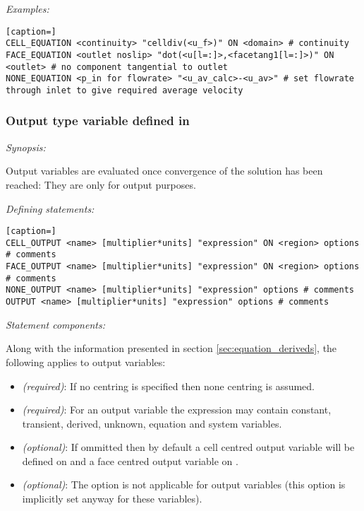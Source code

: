 \emph{Examples:}

\begin{lstlisting}[caption=]
CELL_EQUATION <continuity> "celldiv(<u_f>)" ON <domain> # continuity
FACE_EQUATION <outlet noslip> "dot(<u[l=:]>,<facetang1[l=:]>)" ON <outlet> # no component tangential to outlet
NONE_EQUATION <p_in for flowrate> "<u_av_calc>-<u_av>" # set flowrate through inlet to give required average velocity
\end{lstlisting}

\subsubsection{Output type variable defined in }

\emph{Synopsis:}

Output variables are evaluated once convergence of the solution has been reached:  They are only for output purposes.

\emph{Defining statements:}

\begin{lstlisting}[caption=]
CELL_OUTPUT <name> [multiplier*units] "expression" ON <region> options # comments
FACE_OUTPUT <name> [multiplier*units] "expression" ON <region> options # comments
NONE_OUTPUT <name> [multiplier*units] "expression" options # comments
OUTPUT <name> [multiplier*units] "expression" options # comments
\end{lstlisting}

\emph{Statement components:}

Along with the information presented in section \ref{sec:equation_deriveds}, the following applies to output variables:

\begin{itemize}
\item {} \emph{(required)}:  If no centring is specified then none centring is assumed.
\item {} \emph{(required)}:  For an output variable the expression may contain constant, transient, derived, unknown, equation and system variables.
\item {} \emph{(optional)}:  If ommitted then by default a cell centred output variable will be defined on  and a face centred output variable on .
\item {} \emph{(optional)}:  The  option is not applicable for output variables (this option is implicitly set anyway for these variables).
\end{itemize}

